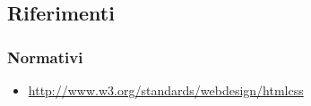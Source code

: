 \subsection{Riferimenti}

\subsubsection{Normativi}

\begin{itemize}
	\item \url{http://www.w3.org/standards/webdesign/htmlcss}
\end{itemize}
